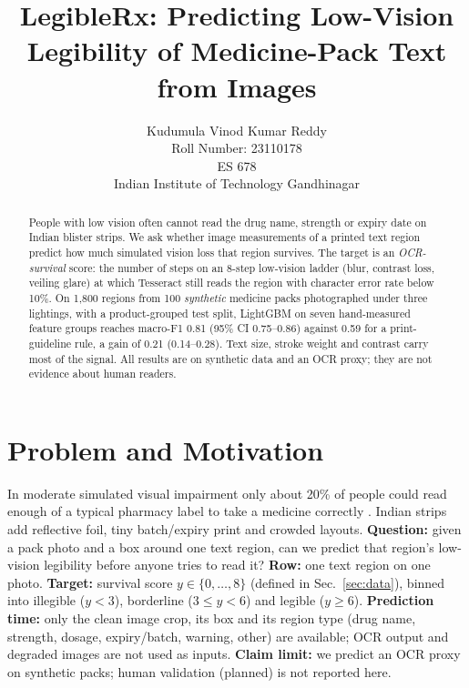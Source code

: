 \documentclass{article}
\title{LegibleRx: Predicting Low-Vision Legibility of Medicine-Pack Text from Images}
\author{%
  Kudumula Vinod Kumar Reddy\\
  Roll Number: 23110178 \\
  ES 678 \\
  Indian Institute of Technology Gandhinagar
}
\begin{document}
\maketitle

\begin{abstract}
People with low vision often cannot read the drug name, strength or expiry date on Indian blister strips. We ask whether
image measurements of a printed text region predict how much simulated vision loss that region survives. The target is an
\emph{OCR-survival} score: the number of steps on an 8-step low-vision ladder (blur, contrast loss, veiling glare) at which
Tesseract still reads the region with character error rate below 10\%. On 1{,}800 regions from 100 \emph{synthetic}
medicine packs photographed under three lightings, with a product-grouped test split, LightGBM on seven hand-measured
feature groups reaches macro-F1 0.81 (95\% CI 0.75--0.86) against 0.59 for a print-guideline rule, a gain of 0.21
(0.14--0.28). Text size, stroke weight and contrast carry most of the signal. All results are on synthetic data and an
OCR proxy; they are not evidence about human readers.
\end{abstract}

\section{Problem and Motivation}
In moderate simulated visual impairment only about 20\% of people could read enough of a typical pharmacy label to take a
medicine correctly \citep{latham2011}. Indian strips add reflective foil, tiny batch/expiry print and crowded layouts.
\textbf{Question:} given a pack photo and a box around one text region, can we predict that region's low-vision legibility
before anyone tries to read it? \textbf{Row:} one text region on one photo. \textbf{Target:} survival score
$y\in\{0,\dots,8\}$ (defined in Sec.~\ref{sec:data}), binned into illegible ($y<3$), borderline ($3\le y<6$) and legible
($y\ge6$). \textbf{Prediction time:} only the clean image crop, its box and its region type (drug name, strength, dosage,
expiry/batch, warning, other) are available; OCR output and degraded images are not used as inputs. \textbf{Claim limit:}
we predict an OCR proxy on synthetic packs; human validation (planned) is not reported here.
\end{document}
